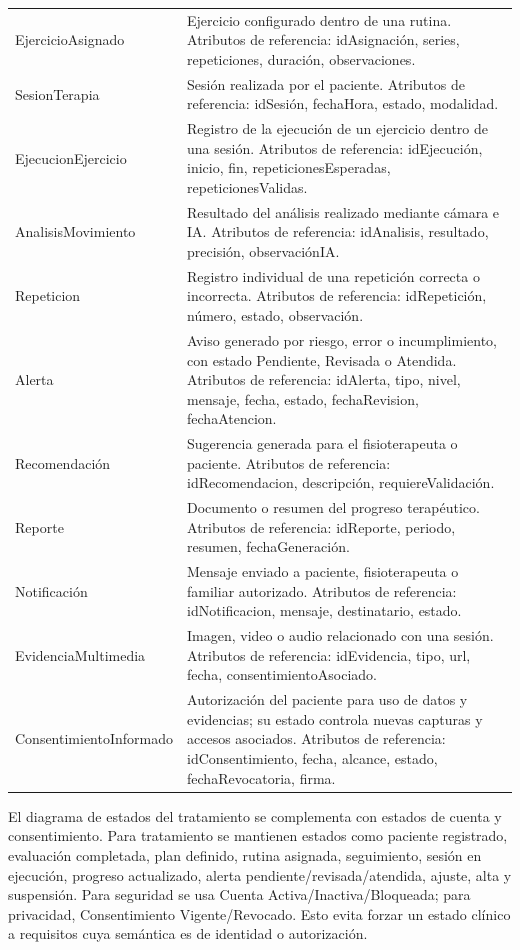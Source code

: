 \documentclass[12pt,a4paper]{article}
\begin{document}
\begin{longtable}{p{}p{}}
EjercicioAsignado & Ejercicio configurado dentro de una rutina. Atributos de referencia: idAsignación, series, repeticiones, duración, observaciones. \\
SesionTerapia & Sesión realizada por el paciente. Atributos de referencia: idSesión, fechaHora, estado, modalidad. \\
EjecucionEjercicio & Registro de la ejecución de un ejercicio dentro de una sesión. Atributos de referencia: idEjecución, inicio, fin, repeticionesEsperadas, repeticionesValidas. \\
AnalisisMovimiento & Resultado del análisis realizado mediante cámara e IA. Atributos de referencia: idAnalisis, resultado, precisión, observaciónIA. \\
Repeticion & Registro individual de una repetición correcta o incorrecta. Atributos de referencia: idRepetición, número, estado, observación. \\
Alerta & Aviso generado por riesgo, error o incumplimiento, con estado Pendiente, Revisada o Atendida. Atributos de referencia: idAlerta, tipo, nivel, mensaje, fecha, estado, fechaRevision, fechaAtencion. \\
Recomendación & Sugerencia generada para el fisioterapeuta o paciente. Atributos de referencia: idRecomendacion, descripción, requiereValidación. \\
Reporte & Documento o resumen del progreso terapéutico. Atributos de referencia: idReporte, periodo, resumen, fechaGeneración. \\
Notificación & Mensaje enviado a paciente, fisioterapeuta o familiar autorizado. Atributos de referencia: idNotificacion, mensaje, destinatario, estado. \\
EvidenciaMultimedia & Imagen, video o audio relacionado con una sesión. Atributos de referencia: idEvidencia, tipo, url, fecha, consentimientoAsociado. \\
ConsentimientoInformado & Autorización del paciente para uso de datos y evidencias; su estado controla nuevas capturas y accesos asociados. Atributos de referencia: idConsentimiento, fecha, alcance, estado, fechaRevocatoria, firma. \\
\bottomrule\end{longtable}\normalsize

El diagrama de estados del tratamiento se complementa con estados de cuenta y consentimiento. Para tratamiento se mantienen estados como paciente registrado, evaluación completada, plan definido, rutina asignada, seguimiento, sesión en ejecución, progreso actualizado, alerta pendiente/revisada/atendida, ajuste, alta y suspensión. Para seguridad se usa Cuenta Activa/Inactiva/Bloqueada; para privacidad, Consentimiento Vigente/Revocado. Esto evita forzar un estado clínico a requisitos cuya semántica es de identidad o autorización.
\end{document}
